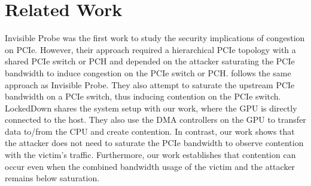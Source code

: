 \section{Related Work}
\label{sec:interconnect-sc-related-work}

Invisible Probe \cite{tan2021invisible} was the first work to study the security implications of congestion on PCIe.
However, their approach required a hierarchical PCIe topology with a shared PCIe switch or PCH and depended on the attacker saturating the PCIe bandwidth to induce congestion on the PCIe switch or PCH.
\citet{giechaskiel2022cross} follows the same approach as Invisible Probe.
They also attempt to saturate the upstream PCIe bandwidth on a PCIe switch, thus inducing contention on the PCIe switch.
LockedDown \cite{side2022lockeddown} shares the system setup with our work, where the GPU is directly connected to the host.
They also use the DMA controllers on the GPU to transfer data to/from the CPU and create contention.
In contrast, our work shows that the attacker does not need to saturate the PCIe bandwidth to observe contention with the victim's traffic. 
Furthermore, our work establishes that contention can occur even when the combined bandwidth usage of the victim and the attacker remains below saturation.
